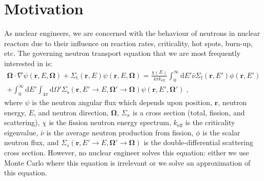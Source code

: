 \section{Motivation}

As nuclear engineers, we are concerned with the behaviour of neutrons in nuclear reactors due to their influence on reaction rates, criticality, hot spots, burn-up, etc. The governing neutron transport equation that we are most frequently interested in is:
\begin{equation}\label{eq:NTE}
\begin{split}
    \mathbf{\Omega}\cdot\nabla\psi(\mathbf{r},E,\mathbf{\Omega}) + \Sigma_\mathrm{t}(\mathbf{r},E)\psi(\mathbf{r},E,\mathbf{\Omega}) = \frac{\chi(E)}{4\pi k_\mathrm{eff}}\int^{\infty}_0\mathrm{d}E' \bar{\nu}\Sigma_\mathrm{f}(\mathbf{r},E')\phi(\mathbf{r},E') \\
    + \int^{\infty}_0\mathrm{d}E'\int_{4\pi}\mathrm{d}\Omega'\Sigma_\mathrm{s}(\mathbf{r},E'\rightarrow E, \mathbf{\Omega}'\rightarrow\mathbf{\Omega})\psi(\mathbf{r},E',\mathbf{\Omega}')\;\mathrm{,}
\end{split}
\end{equation}
where $\psi$ is the neutron angular flux which depends upon position, $\mathbf{r}$, neutron energy, $E$, and neutron direction, $\mathbf{\Omega}$, $\Sigma_x$ is a cross section (total, fission, and scattering), $\chi$ is the fission neutron energy spectrum, $k_\mathrm{eff}$ is the criticality eigenvalue, $\bar{\nu}$ is the average neutron production from fission, $\phi$ is the scalar neutron flux, and $\Sigma_s(\mathbf{r},E'\rightarrow E, \mathbf{\Omega}'\rightarrow \mathbf{\Omega})$ is the double-differential scattering cross section. However, no nuclear engineer solves this equation: either we use Monte Carlo where this equation is irrelevant or we solve an approximation of this equation.

